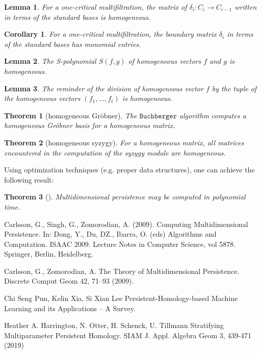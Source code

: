 \documentclass[a4paper,8pt,epsfig]{article}
\newtheorem{theorem}{Theorem}
\newtheorem{lemma}{Lemma}
\newtheorem{corollary}{Corollary}
\begin{document}
 	\begin{lemma}
 		For a one-critical multifiltration, the matrix of $\delta_i: C_i \to C_{i-1}$ written in terms of the standard bases is homogeneous.
 	\end{lemma}
 	\begin{corollary}
 		For a one-critical multifiltration, the boundary matrix $\delta_i$ in terms of the standard bases has monomial entries.
 	\end{corollary}
 	\begin{lemma}
 		The S-polynomial $S(f,g)$ of homogeneous vectors $f$ and $g$ is homogeneous.
 	\end{lemma}
 	\begin{lemma}
 		The reminder of the division of homogeneous vector $f$ by the tuple of the homogeneous vectors $(f_1, ..., f_t)$ is homogeneous.
 	\end{lemma}
 	\begin{theorem}[homogeneous Gröbner]
 		The $\texttt{Buchberger}$ algorithm computes a homogeneous Gröbner basis for a homogeneous matrix.
 	\end{theorem}
  	\begin{theorem}[homogeneous syzygy]
  		For a homogeneous matrix, all matrices encountered in the computation of the syzygy module are homogeneous.
  	\end{theorem}
  
  	Using optimization techniques (e.g. proper data structures), one can achieve the following result:
  	\begin{theorem}[\cite{compmulpers}]
  		Multidimensional persistence may be computed in polynomial time.
  	\end{theorem}
	 
	 \begin{thebibliography}{5}
	 	 Carlsson, G., Singh, G., Zomorodian, A. (2009). Computing Multidimensional Persistence. In: Dong, Y., Du, DZ., Ibarra, O. (eds) Algorithms and Computation. ISAAC 2009. Lecture Notes in Computer Science, vol 5878. Springer, Berlin, Heidelberg.
	 	
	 	 Carlsson, G., Zomorodian, A. The Theory of Multidimensional Persistence. Discrete Comput Geom 42, 71–93 (2009).
	 	
	 	 Chi Seng Pun, Kelin Xia, Si Xian Lee Persistent-Homology-based Machine Learning and its Applications -- A Survey. 
	 	
	 	 Heather A. Harrington, N. Otter, H. Schenck, U. Tillmann Stratifying Multiparameter Persistent Homology. SIAM J. Appl. Algebra Geom 3, 439-471 (2019)
	 	
	\end{thebibliography}
	 
\end{document}
